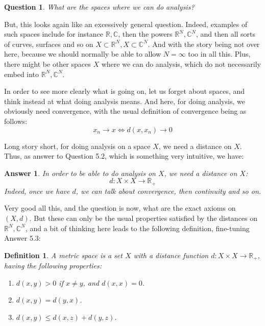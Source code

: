 \documentclass[12pt]{amsbook}
\newtheorem{answer}[theorem]{Answer}
\newtheorem{definition}[theorem]{Definition}
\newtheorem{question}[theorem]{Question}
\begin{document}
\begin{question}
What are the spaces where we can do analysis?
\end{question}

But, this looks again like an excessively general question. Indeed, examples of such spaces include for instance $\mathbb R,\mathbb C$, then the powers $\mathbb R^N,\mathbb C^N$, and then all sorts of curves, surfaces and so on $X\subset\mathbb R^N,X\subset\mathbb C^N$. And with the story being not over here, because we should normally be able to allow $N=\infty$ too in all this. Plus, there might be other spaces $X$ where we can do analysis, which do not necessarily embed into $\mathbb R^N,\mathbb C^N$. 

\bigskip

In order to see more clearly what is going on, let us forget about spaces, and think instead at what doing analysis means. And here, for doing analysis, we obviously need convergence, with the usual definition of convergence being as follows:
$$x_n\to x\iff d(x,x_n)\to0$$

Long story short, for doing analysis on a space $X$, we need a distance on $X$. Thus, as answer to Question 5.2, which is something very intuitive, we have:

\begin{answer}
In order to be able to do analysis on $X$, we need a distance on $X$:
$$d:X\times X\to\mathbb R_+$$
Indeed, once we have $d$, we can talk about convergence, then continuity and so on.
\end{answer}

Very good all this, and the question is now, what are the exact axioms on $(X,d)$. But these can only be the usual properties satisfied by the distances on $\mathbb R^N,\mathbb C^N$, and a bit of thinking here leads to the following definition, fine-tuning Answer 5.3:


\begin{definition}
A metric space is a set $X$ with a distance function $d:X\times X\to\mathbb R_+$, having the following properties:
\begin{enumerate}
\item $d(x,y)>0$ if $x\neq y$, and $d(x,x)=0$.

\item $d(x,y)=d(y,x)$.

\item $d(x,y)\leq d(x,z)+d(y,z)$.
\end{enumerate}
\end{definition}
\end{document}
